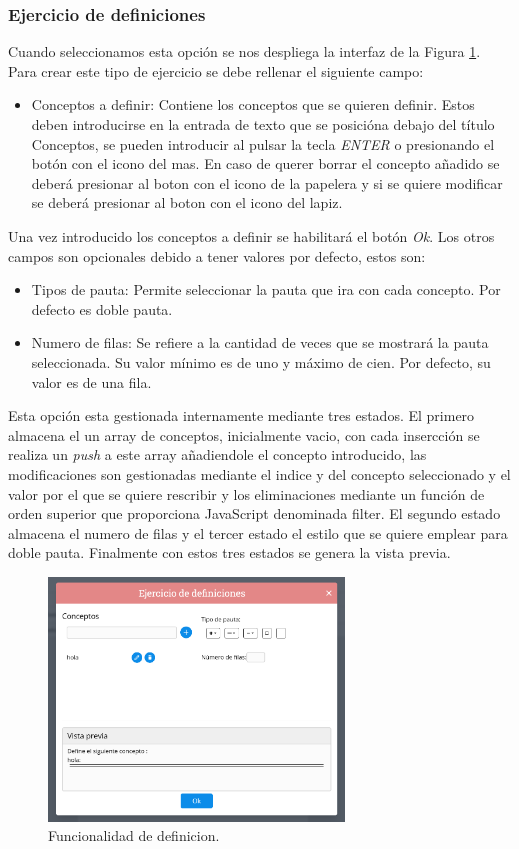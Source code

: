\subsubsection{Ejercicio de definiciones}
Cuando seleccionamos esta opción se nos despliega la interfaz de la Figura \ref{fig:funcionalidadDefinicion}. Para crear este tipo de ejercicio se debe rellenar el siguiente campo:
\begin{itemize}
  \item Conceptos a definir: Contiene los conceptos que se quieren definir. Estos deben introducirse en la entrada de texto que se posicióna debajo del título Conceptos, se pueden introducir al pulsar  la tecla \textit{ENTER} o presionando el botón con el icono del mas. En caso de querer borrar el concepto añadido se deberá presionar al boton con el icono de la papelera y si se quiere modificar se deberá presionar al boton con el icono del lapiz.
\end{itemize}
Una vez introducido los conceptos a definir se habilitará el botón \textit{Ok}. Los otros campos son opcionales debido a tener valores por defecto, estos son:
\begin{itemize}
  \item Tipos de pauta: Permite seleccionar la pauta que ira con cada concepto. Por defecto es doble pauta.
  \item Numero de filas: Se refiere a la cantidad de veces que se mostrará la pauta seleccionada. Su valor mínimo es de uno y máximo de cien. Por defecto, su valor es de una fila.
\end{itemize}
Esta opción esta gestionada internamente mediante tres estados. El primero almacena el un array de conceptos, inicialmente vacio, con cada insercción se realiza un \textit{push} a este array añadiendole el concepto introducido, las modificaciones son gestionadas mediante el indice y del concepto seleccionado y el valor por el que se quiere rescribir y los eliminaciones mediante un función de orden superior que proporciona JavaScript denominada filter. El segundo estado almacena el numero de filas y el tercer estado el estilo que se quiere emplear para doble pauta.
Finalmente con estos tres estados se genera la vista previa.

\begin{figure}[ht!]
  \centering
  \includegraphics[width=0.7\textwidth]{Imagenes/Funcionalidades/EjercicioDefinicion.png}
  \caption{Funcionalidad de definicion.}
  \label{fig:funcionalidadDefinicion}
\end{figure}

